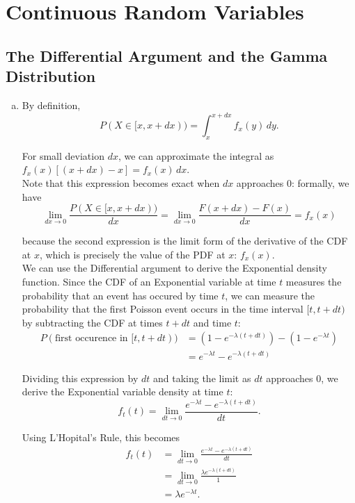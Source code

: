 \newpage

\section{Continuous Random Variables}

\setcounter{subsection}{1}
\subsection{The Differential Argument and the Gamma Distribution}

\begin{enumerate}[a)]
    \item By definition, 
    \[
        P(X \in [x, x+ dx)) = \int_{x}^{x+dx} f_x(y) \, dy.
    \]

    For small deviation $dx$, we can approximate the integral as $f_x(x)\left[ (x + dx) - x \right] = f_x(x)\, dx$. \\

    Note that this expression becomes exact when $dx$ approaches $0$: formally, we have
    \[
        \lim_{dx \to 0} \frac{P(X \in [x, x+dx))}{dx} = \lim_{dx \to 0} \frac{F(x+dx) - F(x)}{dx} = f_x(x)
    \]

    because the second expression is the limit form of the derivative of the CDF at $x$, which is precisely the value of the PDF at $x$: 
    $f_x(x)$. \\

    We can use the Differential argument to derive the Exponential density function. 
    Since the CDF of an Exponential variable at time $t$ measures the probability that an event has occured by time $t$, we can measure the probability
    that the first Poisson event occurs in the time interval $[t, t+dt)$ by subtracting the CDF at times $t+dt$ and time $t$:
    \begin{align*}
        P(\text{first occurence in } [t, t+dt)) &= \left( 1 - e^{-\lambda(t+dt)}\right) - \left( 1 - e^{-\lambda t} \right) \\
        &= e^{-\lambda t} - e^{-\lambda(t+dt)}
    \end{align*}

    Dividing this expression by $dt$ and taking the limit as $dt$ approaches $0$, we derive the Exponential variable density at time $t$:
    \[
        f_t(t) = \lim_{dt \to 0} \frac{e^{-\lambda t} - e^{-\lambda (t+dt)}}{dt}.
    \]

    Using L'Hopital's Rule, this becomes
    \begin{align*}
        f_t(t) &= \lim_{dt \to 0} \frac{e^{-\lambda t} - e^{-\lambda (t+dt)}}{dt} \\
        &= \lim_{dt \to 0} \frac{\lambda e^{-\lambda (t+dt)}}{1} \\
        &= \lambda e^{-\lambda t}.
    \end{align*}


\end{enumerate}
